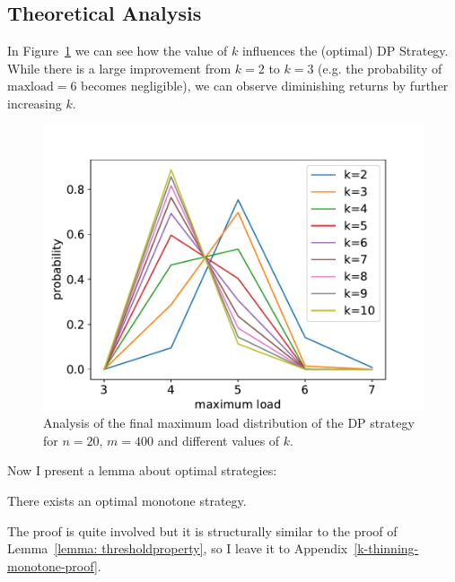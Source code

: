 \subsection{Theoretical Analysis}


In Figure~\ref{k-thinning-dp-maxload} we can see how the value of $k$ influences the (optimal) DP Strategy. While there is a large improvement from $k=2$ to $k=3$ (e.g. the probability of $\mathrm{maxload}=6$ becomes negligible), we can observe diminishing returns by further increasing $k$.


\begin{figure}[h]
    \centering
    \includegraphics[scale=0.6]{Chapter4/Figs/k_thinning_max_load_distribution_5_20.pdf}
    \caption{Analysis of the final maximum load distribution of the DP strategy for $n=20$, $m=400$ and different values of $k$.}
    \label{k-thinning-dp-maxload}
\end{figure}

Now I present a lemma about optimal strategies:

\begin{lemma} \label{lemma: k-thinning-monotone}
There exists an optimal monotone strategy.
\end{lemma}



The proof is quite involved but it is structurally similar to the proof of Lemma~\ref{lemma: thresholdproperty}, so I leave it to Appendix~\ref{k-thinning-monotone-proof}.


